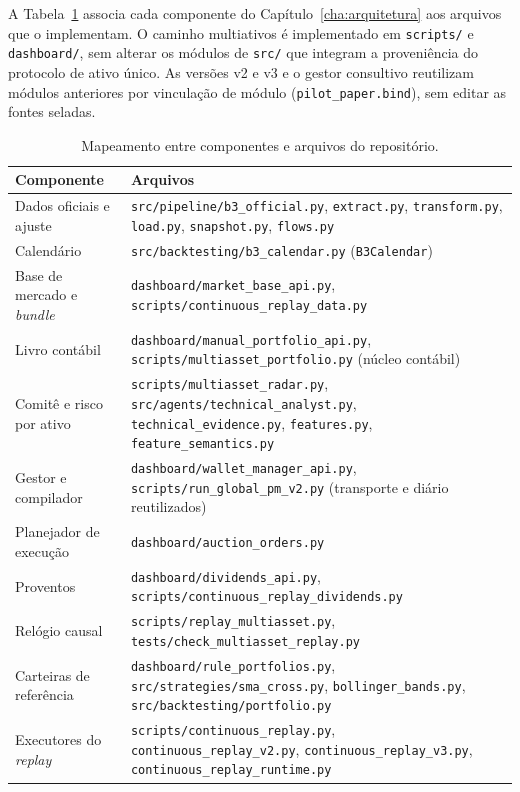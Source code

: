 A Tabela~\ref{tab:mapa-arquivos} associa cada componente do Capítulo~\ref{cha:arquitetura} aos arquivos que o implementam. O caminho multiativos é implementado em \texttt{scripts/} e \texttt{dashboard/}, sem alterar os módulos de \texttt{src/} que integram a proveniência do protocolo de ativo único. As versões v2 e v3 e o gestor consultivo reutilizam módulos anteriores por vinculação de módulo (\texttt{pilot\_paper.bind}), sem editar as fontes seladas.

\begin{table}[H]
\centering
\caption{Mapeamento entre componentes e arquivos do repositório.}
\label{tab:mapa-arquivos}
\small
\begin{tabular}{>{\raggedright\arraybackslash}p{4.0cm} >{\raggedright\arraybackslash}p{11.0cm}}
\toprule
\textbf{Componente} & \textbf{Arquivos} \\
\midrule
Dados oficiais e ajuste & \texttt{src/pipeline/b3\_official.py}, \texttt{extract.py}, \texttt{transform.py}, \texttt{load.py}, \texttt{snapshot.py}, \texttt{flows.py} \\
Calendário & \texttt{src/backtesting/b3\_calendar.py} (\texttt{B3Calendar}) \\
Base de mercado e \textit{bundle} & \texttt{dashboard/market\_base\_api.py}, \texttt{scripts/continuous\_replay\_data.py} \\
Livro contábil & \texttt{dashboard/manual\_portfolio\_api.py}, \texttt{scripts/multiasset\_portfolio.py} (núcleo contábil) \\
Comitê e risco por ativo & \texttt{scripts/multiasset\_radar.py}, \texttt{src/agents/technical\_analyst.py}, \texttt{technical\_evidence.py}, \texttt{features.py}, \texttt{feature\_semantics.py} \\
Gestor e compilador & \texttt{dashboard/wallet\_manager\_api.py}, \texttt{scripts/run\_global\_pm\_v2.py} (transporte e diário reutilizados) \\
Planejador de execução & \texttt{dashboard/auction\_orders.py} \\
Proventos & \texttt{dashboard/dividends\_api.py}, \texttt{scripts/continuous\_replay\_dividends.py} \\
Relógio causal & \texttt{scripts/replay\_multiasset.py}, \texttt{tests/check\_multiasset\_replay.py} \\
Carteiras de referência & \texttt{dashboard/rule\_portfolios.py}, \texttt{src/strategies/sma\_cross.py}, \texttt{bollinger\_bands.py}, \texttt{src/backtesting/portfolio.py} \\
Executores do \textit{replay} & \texttt{scripts/continuous\_replay.py}, \texttt{continuous\_replay\_v2.py}, \texttt{continuous\_replay\_v3.py}, \texttt{continuous\_replay\_runtime.py} \\

\end{tabular}
\end{table}
